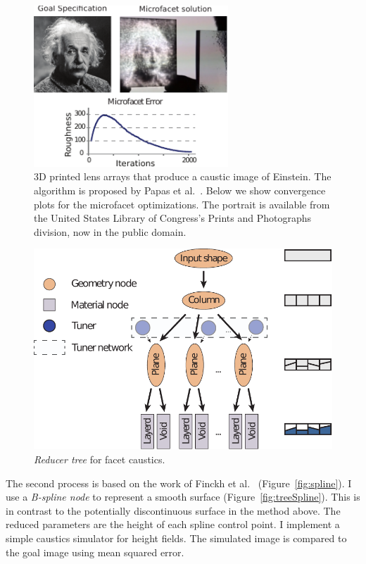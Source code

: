 \begin{figure}[h]
\centering
\includegraphics[width=0.65\textwidth]{figure/facet.pdf}
\caption {3D printed lens arrays that produce a caustic image of Einstein.
The algorithm is proposed by Papas et al.~.
Below we show convergence plots for the microfacet optimizations.
The portrait is available from the United States Library of Congress's Prints and Photographs division,
now in the public domain.
}
\label{fig:facet}
\end{figure}

\begin{figure}[h]
\centering
\includegraphics[scale=0.7]{figure/treeFacet.pdf}
\caption {\emph{Reducer tree} for facet caustics.
}
\label{fig:treeFacet}
\end{figure}

The second process is based on the work of Finckh et al.~ (Figure~\ref{fig:spline}).
I use a \emph{B-spline node} to represent a smooth surface (Figure~\ref{fig:treeSpline}).
This is in contrast to the potentially discontinuous surface in the method above.
The reduced parameters are the height of each spline control point.
I implement a simple caustics simulator for height fields.
The simulated image is compared to the goal image using mean squared error.

